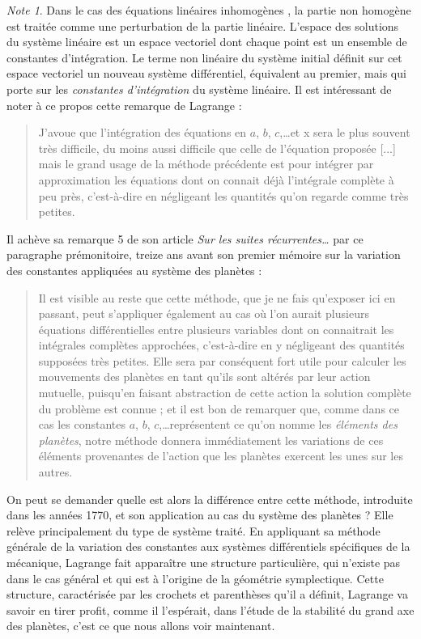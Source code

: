 \documentclass[12pt,paperletter, reqno]{amsart}
\theoremstyle{plain}
\theoremstyle{remark}
\newtheorem*{note}{Note}
\begin{document}
\begin{note}
    Dans le cas des équations linéaires inhomogènes \cite{Lagrange6},
    la partie non homogène est traitée comme une perturbation de la partie linéaire.
    L'espace des solutions du système linéaire est un espace vectoriel dont chaque point est un ensemble de constantes d'intégration.
    Le terme non linéaire du système initial définit sur cet espace vectoriel un nouveau système différentiel,
    équivalent au premier,
    mais qui porte sur les \emph{constantes d'intégration} du système linéaire.
    Il est intéressant de noter à ce propos cette remarque de Lagrange \cite[page 163]{Lagrange6} :
    \begin{quote}
      \og J'avoue que l'intégration des équations en $a$, $b$, $c$,\ldots et x sera le plus souvent très difficile, du moins aussi difficile que celle de l'équation proposée [...] mais le grand usage de la méthode précédente est pour intégrer par approximation les équations dont on connait déjà l'intégrale complète à peu près, c'est-à-dire en négligeant les quantités qu'on regarde comme très petites.\fg{}
    \end{quote}
    Il achève sa remarque 5 de son article \emph{Sur les suites récurrentes\ldots} par ce paragraphe prémonitoire,
    treize ans avant son premier mémoire sur la variation des constantes appliquées au système des planètes :
    \begin{quote}
      \og Il est visible au reste que cette méthode, que je ne fais qu'exposer ici en passant, peut s'appliquer également au cas où l'on aurait plusieurs équations différentielles entre plusieurs variables dont on connaitrait les intégrales complètes approchées, c'est-à-dire en y négligeant des quantités supposées très petites. Elle sera par conséquent fort utile pour calculer les mouvements des planètes en tant qu'ils sont altérés par leur action mutuelle, puisqu'en faisant abstraction de cette action la solution complète du problème est connue ; et il est bon de remarquer que, comme dans ce cas les constantes $a$, $b$, $c$,\ldots représentent ce qu'on nomme les \emph{éléments des planètes}, notre méthode donnera immédiatement les variations de ces éléments provenantes de l'action que les planètes exercent les unes sur les autres.\fg{}
    \end{quote}
    
    On peut se demander quelle est alors la différence entre cette méthode,
    introduite dans les années 1770,
    et son application au cas du système des planètes ?
    Elle relève principalement du type de système traité.
    En appliquant sa méthode générale de la variation des constantes aux systèmes différentiels spécifiques de la mécanique,
    Lagrange fait apparaître une structure particulière,
    qui n'existe pas dans le cas général et qui est à l'origine de la géométrie symplectique.
    Cette structure,
    caractérisée par les crochets et parenthèses qu'il a définit,
    Lagrange va savoir en tirer profit,
    comme il l'espérait,
    dans l'étude de la stabilité du grand axe des planètes,
    c'est ce que nous allons voir maintenant.
  \end{note}
  
\end{document}
